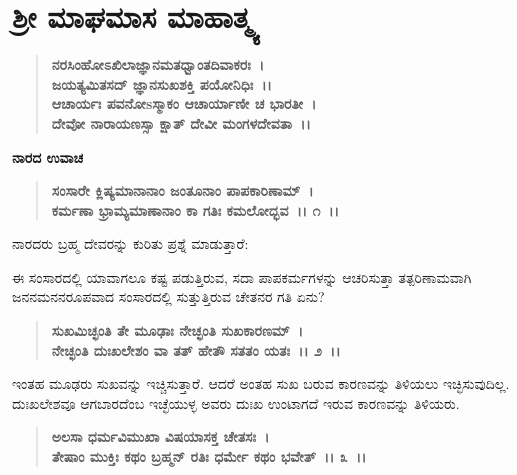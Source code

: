 

\begin{center}
\phantom{श्रीः}
\end{center}

\begin{center}
\phantom{।। श्री गुरुराजो विजयते~।।}
\end{center}


\chapter{ ಶ‍್ರೀ ಮಾಘಮಾಸ ಮಾಹಾತ್ಮ್ಯ}

\begin{verse}
\textbf{ನರಸಿಂಹೋಽಖಿಲಾಜ್ಞಾನಮತಧ್ವಾಂತದಿವಾಕರಃ~। }\\\textbf{ಜಯತ್ಯಮಿತಸದ್ ಜ್ಞಾನಸುಖಶಕ್ತಿ ಪಯೋನಿಧಿಃ~।।}\\\textbf{ಆಚಾರ್ಯಃ ಪವನೋsಸ್ಮಾಕಂ ಆಚಾರ್ಯಾಣೀ ಚ ಭಾರತೀ~। }\\\textbf{ದೇವೋ ನಾರಾಯಣಸ್ಸಾ ಕ್ಷಾತ್ ದೇವೀ ಮಂಗಳದೇವತಾ~।।}
\end{verse}

\begin{flushleft}
\textbf{ನಾರದ ಉವಾಚ\enginline{-}}
\end{flushleft}

\begin{verse}
\textbf{ಸಂಸಾರೇ ಕ್ಲಿಷ್ಯಮಾನಾನಾಂ ಜಂತೂನಾಂ ಪಾಪಕಾರಿಣಾಮ್~। }\\\textbf{ಕರ್ಮಣಾ ಭ್ರಾಮ್ಯಮಾಣಾನಾಂ ಕಾ ಗತಿಃ ಕಮಲೋದ್ಭವ~।। ೧~।।}
\end{verse}

\noindent
ನಾರದರು ಬ್ರಹ್ಮ ದೇವರನ್ನು ಕುರಿತು ಪ್ರಶ್ನೆ ಮಾಡುತ್ತಾರೆ:\enginline{-}

ಈ ಸಂಸಾರದಲ್ಲಿ ಯಾವಾಗಲೂ ಕಷ್ಟ ಪಡುತ್ತಿರುವ, ಸದಾ ಪಾಪಕರ್ಮಗಳನ್ನು ಆಚರಿಸುತ್ತಾ ತತ್ಪರಿಣಾಮವಾಗಿ ಜನನಮನನರೂಪವಾದ ಸಂಸಾರದಲ್ಲಿ ಸುತ್ತುತ್ತಿರುವ ಚೇತನರ ಗತಿ ಏನು?

\begin{verse}
\textbf{ಸುಖಮಿಚ್ಛಂತಿ ತೇ ಮೂಢಾಃ ನೇಚ್ಛಂತಿ ಸುಖಕಾರಣಮ್~।}\\\textbf{ನೇಚ್ಛಂತಿ ದುಃಖಲೇಶಂ ವಾ ತತ್ ಹೇತೌ ಸತತಂ ಯತಃ~।। ೨~।।}
\end{verse}

ಇಂತಹ ಮೂಢರು ಸುಖವನ್ನು ಇಚ್ಚಿಸುತ್ತಾರೆ. ಆದರೆ ಅಂತಹ ಸುಖ ಬರುವ ಕಾರಣ\-ವನ್ನು ತಿಳಿಯಲು ಇಚ್ಛಿಸುವುದಿಲ್ಲ. ದುಃಖಲೇಶವೂ ಆಗಬಾರದೆಂಬ ಇಚ್ಛೆಯುಳ್ಳ ಅವರು ದುಃಖ ಉಂಟಾಗದೆ ಇರುವ ಕಾರಣವನ್ನು ತಿಳಿಯರು.

\begin{verse}
\textbf{ಅಲಸಾ ಧರ್ಮವಿಮುಖಾ ವಿಷಯಾಸಕ್ತ ಚೇತಸಃ~।}\\\textbf{ತೇಷಾಂ ಮುಕ್ತಿಃ ಕಥಂ ಬ್ರಹ್ಮನ್ ರತಿಃ ಧರ್ಮೇ ಕಥಂ ಭವೇತ್~।। ೩~।।}
\end{verse}

